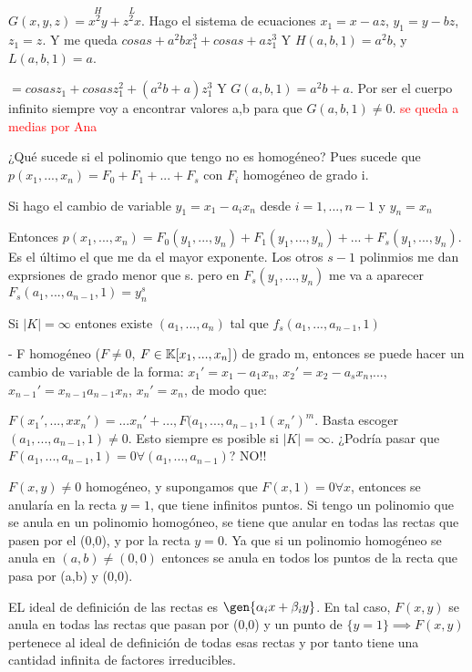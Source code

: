 \begin{example}
 $G(x,y,z)=\stackrel{H}{x^2y}+\stackrel{L}{z^2x}$. Hago el sistema de ecuaciones $x_1=x-az$, $y_1=y-bz$, $z_1=z$. Y me queda $cosas + a^2b x_1^3+cosas+ az_1^3$ Y $H(a,b,1)=a^2b$, y $L(a,b,1)=a$.

 $= cosas z_1+ cosas z_1^2+(a^2b+a)z_1^3$ Y $G(a,b,1)=a^2b+a$. Por ser el cuerpo infinito siempre voy a encontrar valores a,b para que $G(a,b,1) \neq 0$. \textcolor{red}{se queda a medias por Ana}
\end{example}


¿Qué sucede si el polinomio que tengo no es homogéneo? Pues sucede que $p(x_1,...,x_n)=F_0+F_1+...+F_s$ con $F_i$ homogéneo de grado i.

Si hago el cambio de variable $y_1=x_1-a_ix_n$ desde $i=1,...,n-1$ y $y_n=x_n$

Entonces $p(x_1,...,x_n)=F_0(y_1,...,y_n)+F_1(y_1,...,y_n)+...+F_s(y_1,...,y_n)$. Es el último el que me da el mayor exponente. Los otros $s-1$ polinmios me dan exprsiones de grado menor que s. pero en $F_s(y_1,...,y_n)$ me va a aparecer $F_s(a_{1},...,a_{n-1}, 1) = y_n^s$

Si $|K|= \infty$ entones existe $(a_1,...,a_n)$ tal que  $f_s(a_1,...,a_{n-1}, 1)$


- F homogéneo ($F \neq 0$, $F \in \mathbb{K}[x_1,...,x_n]$) de grado m, entonces se puede hacer un cambio de variable de la forma:
$x_1'=x_1-a_1x_n$, $x_2'=x_2-a_sx_n$,...,$x_{n-1}'=x_{n-1}a_{n-1}x_n$, $x_n'=x_n$, de modo que:

$F(x_1',...,xx_n')=... x_n'+...,F(a_1,...,a_{n-1},1(x_n')^m$. Basta escoger $(a_1,...,a_{n-1},1)\neq 0$. Esto siempre es posible si $|K|=\infty$. ¿Podría pasar que $F(a_1,...,a_{n-1},1)=0 \forall(a_1,...,a_{n-1})$? NO!!

$F(x,y)\neq 0$ homogéneo, y supongamos que $F(x,1)=0 \forall x$, entonces se anularía en la recta $y=1$, que tiene infinitos puntos. Si tengo un polinomio que se anula en un polinomio homogóneo, se tiene que anular en todas las rectas que pasen por el (0,0), y por la recta $y=0$. Ya que si un polinomio homogéneo se anula en $(a,b)\neq (0,0)$ entonces se anula en todos los puntos de la recta que pasa por (a,b) y (0,0).

EL ideal de definición de las rectas es $\gen{\alpha_ix+\beta_iy}$. En tal caso, $F(x,y)$ se anula en todas las rectas que pasan por (0,0) y un punto de $\{ y=1 \} \implies F(x,y)$ pertenece al ideal de definición de todas esas rectas y por tanto tiene una cantidad infinita de factores irreducibles.

